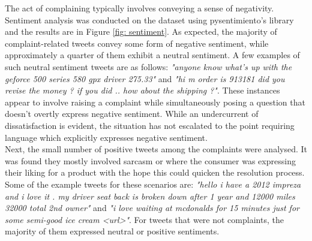 The act of complaining typically involves conveying a sense of negativity. Sentiment analysis was conducted on the dataset using  pysentimiento's library \cite{perezPysentimientoPythonToolkit2021} and the results are in Figure \ref{fig: sentiment}. As expected, the majority of complaint-related tweets convey some form of negative sentiment, while approximately a quarter of them exhibit a neutral sentiment. A few examples of such neutral sentiment tweets are as follows: \textit{"anyone know what's up with the geforce 500 series 580 gpx driver 275.33"} and \textit{"hi m order is 913181 did you revise the money ? if you did .. how about the shipping ?"}. These instances appear to involve raising a complaint while simultaneously posing a question that doesn't overtly express negative sentiment. While an undercurrent of dissatisfaction is evident, the situation has not escalated to the point requiring language which explicitly expresses negative sentiment.\\

Next, the small number of positive tweets among the complaints were analysed. It was found they mostly involved sarcasm or where the consumer was expressing their liking for a product with the hope this could quicken the resolution process. Some of the example tweets for these scenarios are: \textit{"hello i have a 2012 impreza and i love it . my driver seat back is broken down after 1 year and 12000 miles 32000 total 2nd owner"} and \textit{"i love waiting at mcdonalds for 15 minutes just for some semi-good ice cream <url>"}. For tweets that were not complaints, the majority of them expressed neutral or positive sentiments.

